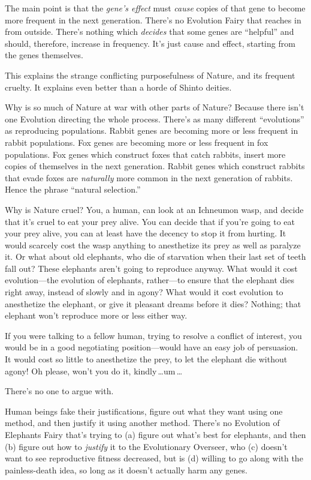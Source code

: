 {
 The main point is that the \textit{gene's effect}
must \textit{cause} copies of that gene to become more frequent in the
next generation. There's no Evolution Fairy that
reaches in from outside. There's nothing which
\textit{decides} that some genes are
``helpful'' and should, therefore,
increase in frequency. It's just cause and effect,
starting from the genes themselves.}

{
 This explains the strange conflicting purposefulness of Nature,
and its frequent cruelty. It explains even better than a horde of
Shinto deities.}

{
 Why is so much of Nature at war with other parts of Nature?
Because there isn't one Evolution directing the whole
process. There's as many different
``evolutions'' as reproducing
populations. Rabbit genes are becoming more or less frequent in rabbit
populations. Fox genes are becoming more or less frequent in fox
populations. Fox genes which construct foxes that catch rabbits, insert
more copies of themselves in the next generation. Rabbit genes which
construct rabbits that evade foxes are \textit{naturally} more common
in the next generation of rabbits. Hence the phrase
``natural selection.''}

{
 Why is Nature cruel? You, a human, can look at an Ichneumon wasp,
and decide that it's cruel to eat your prey alive. You
can decide that if you're going to eat your prey alive,
you can at least have the decency to stop it from hurting. It would
scarcely cost the wasp anything to anesthetize its prey as well as
paralyze it. Or what about old elephants, who die of starvation when
their last set of teeth fall out? These elephants
aren't going to reproduce anyway. What would it cost
evolution---the evolution of elephants, rather---to ensure that the
elephant dies right away, instead of slowly and in agony? What would it
cost evolution to anesthetize the elephant, or give it pleasant dreams
before it dies? Nothing; that elephant won't reproduce
more or less either way.}

{
 If you were talking to a fellow human, trying to resolve a
conflict of interest, you would be in a good negotiating
position---would have an easy job of persuasion. It would cost so
little to anesthetize the prey, to let the elephant die without agony!
Oh please, won't you do it, kindly\,\ldots um\,\ldots}

{
 There's no one to argue with.}

{
 Human beings fake their justifications, figure out what they want
using one method, and then justify it using another method.
There's no Evolution of Elephants Fairy
that's trying to (a) figure out what's
best for elephants, and then (b) figure out how to \textit{justify} it
to the Evolutionary Overseer, who (c) doesn't want to
see reproductive fitness decreased, but is (d) willing to go along with
the painless-death idea, so long as it doesn't actually
harm any genes.}

